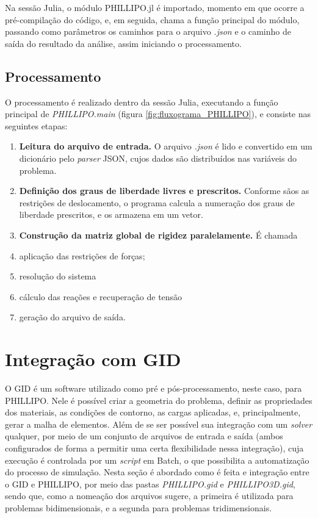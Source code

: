 Na sessão Julia, o módulo PHILLIPO.jl é importado, momento em que ocorre a pré-compilação do código, e, em seguida, chama a função principal do módulo, passando como parâmetros os caminhos para o arquivo \emph{.json} e o caminho de saída do resultado da análise, assim iniciando o processamento.

\subsection{Processamento}

O processamento é realizado dentro da sessão Julia, executando a função principal de \emph{PHILLIPO.main} (figura \ref{fig:fluxograma_PHILLIPO}), e consiste nas seguintes etapas:
\begin{enumerate}
    \item \textbf{Leitura do arquivo de entrada.} O arquivo \emph{.json} é lido e convertido em um dicionário pelo \emph{parser} JSON, cujos dados são distribuídos nas variáveis do problema.
    \item \textbf{Definição dos graus de liberdade livres e prescritos.} Conforme sãos as restrições de deslocamento, o programa calcula a numeração dos graus de liberdade prescritos, e os armazena em um vetor.
    \item \textbf{Construção da matriz global de rigidez paralelamente.} É chamada
    \item aplicação das restrições de forças;
    \item resolução do sistema 
    \item cálculo das reações e recuperação de tensão
    \item geração do arquivo de saída.

\end{enumerate}


\section{Integração com GID}

O GID é um software utilizado como pré e pós-processamento, neste caso, para PHILLIPO. Nele é possível criar a geometria do problema, definir as propriedades dos materiais, as condições de contorno, as cargas aplicadas, e, principalmente, gerar a malha de elementos. Além de se ser possível sua integração com um \emph{solver} qualquer, por meio de um conjunto de arquivos de entrada e saída (ambos configurados de forma a permitir uma certa flexibilidade nessa integração), cuja execução é controlada por um \emph{script} em Batch, o que possibilita a automatização do processo de simulação. Nesta seção é abordado como é feita e integração entre o GID e PHILLIPO, por meio das pastas \emph{PHILLIPO.gid} e \emph{PHILLIPO3D.gid}, sendo que, como a nomeação dos arquivos sugere, a primeira é utilizada para problemas bidimensionais, e a segunda para problemas tridimensionais.

